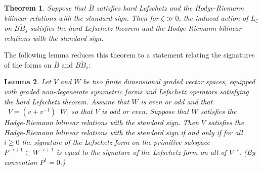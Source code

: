 \documentclass[11pt]{amsart}
\numberwithin{equation}{section}
\def\z{\zeta}
\def\ov{\overline}
\def\un{\underline}
\newtheorem{thm}{Theorem}[section]
\newtheorem{lem}[thm]{Lemma}
\theoremstyle{definition}
\theoremstyle{remark}
\DeclareMathOperator{\gdim}{\un{\dim}}
\begin{document}
\begin{thm} \label{thm:towards infinity} Suppose that $\ov{B}$
  satisfies hard Lefschetz and the Hodge-Riemann bilinear relations
  with the standard sign. Then for $\z \gg 0$, the induced action of $L_\z$ on
$\ov{BB_s}$ satisfies the hard Lefschetz theorem and the Hodge-Riemann
bilinear relations with the standard sign.\end{thm}

The following lemma reduces this theorem to a statement relating the signatures of the forms on $\ov{B}$ and $\ov{B B_s}$:

\begin{lem} \label{lem:hrsig} Let $V$ and $W$ be two finite
  dimensional graded vector spaces, equipped with graded non-degenerate
  symmetric forms and Lefschetz operators satisfying the hard
  Lefschetz theorem. Assume that $W$ is even or odd and that $\gdim V
  = (v+v^{-1}) \gdim W$, so that $V$ is odd or even. Suppose that $W$ satisfies the Hodge-Riemann bilinear relations with the standard sign.
Then $V$ satisfies the Hodge-Riemann bilinear
relations with the standard sign if and only if for all $i \ge 0$ the signature of the
Lefschetz form on the primitive subspace $P^{-i+1} \subset W^{-i+1}$ is
equal to the signature of the Lefschetz form on all of
$V^{-i}$. (By convention $P^1  = 0$.)\end{lem}
\end{document}
